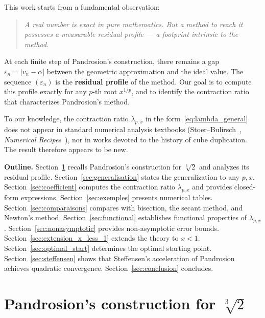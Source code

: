 \documentclass[11pt,a4paper]{article}
\theoremstyle{definition}
\newcommand{\cbrt}[1]{\sqrt[3]{#1}}
\newcommand{\eps}{\varepsilon}
\begin{document}
\medskip

This work starts from a fundamental observation:

\begin{quote}
\itshape A real number is exact in pure mathematics. But a method to reach it possesses a measurable residual profile --- a footprint intrinsic to the method.
\end{quote}

At each finite step of Pandrosion's construction, there remains a gap $\eps_n = |v_n - \alpha|$ between the geometric approximation and the ideal value. The sequence $(\eps_n)$ is the \textbf{residual profile} of the method. Our goal is to compute this profile exactly for any $p$-th root $x^{1/p}$, and to identify the contraction ratio that characterizes Pandrosion's method.

\medskip

To our knowledge, the contraction ratio $\lambda_{p,x}$ in the form~\eqref{eq:lambda_general} does not appear in standard numerical analysis textbooks (Stoer--Bulirsch~\cite{stoer}, \textit{Numerical Recipes}~\cite{numrecipes}), nor in works devoted to the history of cube duplication. The result therefore appears to be new.

\medskip

\textbf{Outline.} Section~\ref{sec:pandrosion3} recalls Pandrosion's construction for $\cbrt{2}$ and analyzes its residual profile. Section~\ref{sec:generalisation} states the generalization to any $p, x$. Section~\ref{sec:coefficient} computes the contraction ratio $\lambda_{p,x}$ and provides closed-form expressions. Section~\ref{sec:exemples} presents numerical tables. Section~\ref{sec:comparaisons} compares with bisection, the secant method, and Newton's method. Section~\ref{sec:functional} establishes functional properties of $\lambda_{p,x}$. Section~\ref{sec:nonasymptotic} provides non-asymptotic error bounds. Section~\ref{sec:extension_x_less_1} extends the theory to $x < 1$. Section~\ref{sec:optimal_start} determines the optimal starting point. Section~\ref{sec:steffensen} shows that Steffensen's acceleration of Pandrosion achieves quadratic convergence. Section~\ref{sec:conclusion} concludes.

\section{Pandrosion's construction for \texorpdfstring{$\cbrt{2}$}{cbrt(2)}}
\label{sec:pandrosion3}
\end{document}
